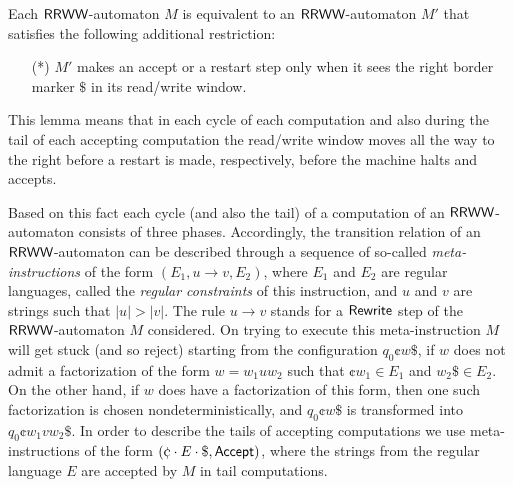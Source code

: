 \begin{lemma}
Each $\mbox{\sf RRWW}$-automaton $M$ is equivalent to an $\mbox{\sf RRWW}$-automaton $M'$ that satisfies the following additional restriction:
\begin{enumerate}
\item[(*)] $M'$ makes an accept or a restart step only when it sees the right border marker $\$$ in its read/write window.
\end{enumerate}
\end{lemma}

This lemma means that in each cycle of each computation and also during the tail of each accepting computation the read/write window moves all the way to the right before a restart is made, respectively, before the machine halts and accepts.

Based on this fact each cycle (and also the tail) of a computation of an $\mbox{\sf RRWW}$-automaton consists of three phases. Accordingly, the transition relation of an $\mbox{\sf RRWW}$-automaton can be described through a sequence of so-called \emph{meta-instructions} of the form $(E_1, u \to v, E_2)$, where $E_1$ and $E_2$ are regular languages, called the \emph{regular constraints} of this instruction, and $u$ and $v$ are strings such that $|u| > |v|$. The rule $u \to v$ stands for a \index{$\Rewrite$}$\Rewrite$ step of the $\mbox{\sf RRWW}$-automaton $M$ considered. On trying to execute this meta-instruction $M$ will get stuck (and so reject) starting from the configuration $q_0 \cent w \$$, if $w$ does not admit a factorization of the form $w = w_1 u w_2$ such that $\cent w_1 \in E_1$ and $w_2 \$ \in E_2$. On the other hand, if $w$ does have a factorization of this form, then one such factorization is chosen nondeterministically, and $q_0 \cent w \$$ is transformed into $q_0 \cent w_1 v w_2 \$$. In order to describe the tails of accepting computations we use meta-instructions of the form \index{$\Accept$}$(\cent \cdot E \cdot \$, \Accept)$, where the strings from the regular language $E$ are accepted by $M$ in tail computations.

